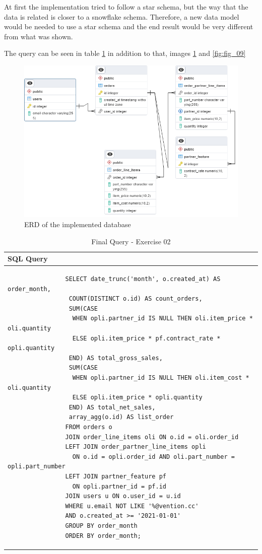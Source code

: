 \documentclass[]{report}
\begin{document}
At first the implementation tried to follow a star schema, but the way that the data is related is closer to a snowflake schema. Therefore, a new data model would be needed to use a star schema and the end result would be very different from what was shown.

The query can be seen in table \textcolor{blue}{\ref{tbl:sql_query}} in addition to that, images \textcolor{blue}{\ref{fig:fig_08}} and \textcolor{blue}{\ref{fig:fig_09}}

\begin{figure}[htb]
	\centering
	\includegraphics[width=1.1\textwidth]{01_data_modeling_resize}
	\caption{ERD of the implemented database}
	\label{fig:fig_08}
\end{figure}

\begin{table}[h]
	\centering
	\begin{tabular}{l}
		\hline
		\textbf{SQL Query} \\
		\hline
		\begin{minipage}[t]{0.9\textwidth}
			\begin{verbatim}
				SELECT date_trunc('month', o.created_at) AS order_month,
				 COUNT(DISTINCT o.id) AS count_orders,
				 SUM(CASE
				  WHEN opli.partner_id IS NULL THEN oli.item_price * oli.quantity
				  ELSE opli.item_price * pf.contract_rate * opli.quantity
				 END) AS total_gross_sales,
				 SUM(CASE
				  WHEN opli.partner_id IS NULL THEN oli.item_cost * oli.quantity
				  ELSE opli.item_price * opli.quantity
				 END) AS total_net_sales,
				 array_agg(o.id) AS list_order
				FROM orders o
				JOIN order_line_items oli ON o.id = oli.order_id
				LEFT JOIN order_partner_line_items opli 
				  ON o.id = opli.order_id AND oli.part_number = opli.part_number
				LEFT JOIN partner_feature pf 
				  ON opli.partner_id = pf.id
				JOIN users u ON o.user_id = u.id
				WHERE u.email NOT LIKE '%@vention.cc'
				AND o.created_at >= '2021-01-01'
				GROUP BY order_month
				ORDER BY order_month;
			\end{verbatim}
		\end{minipage} \\
		\hline
	\end{tabular}
	\caption{Final Query - Exercise 02}
	\label{tbl:sql_query}
\end{table}
\end{document}

